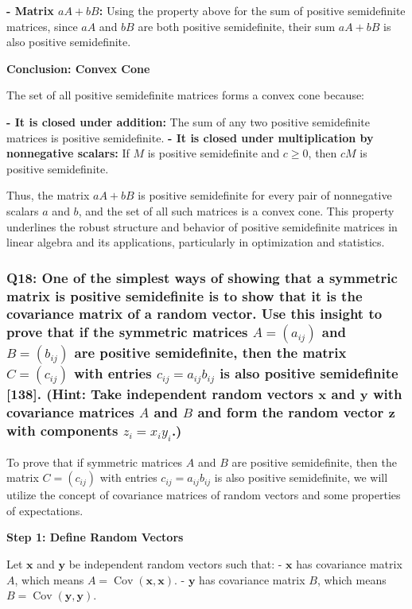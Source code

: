 \documentclass[8pt]{article}
\begin{document}
{{\textbf{- Matrix \(aA + bB\): }Using the property above for the sum of positive semidefinite matrices, since \(aA\) and \(bB\) are both positive semidefinite, their sum \(aA + bB\) is also positive semidefinite.

\textbf{Conclusion: Convex Cone}

The set of all positive semidefinite matrices forms a convex cone because:

\textbf{- It is closed under addition:} The sum of any two positive semidefinite matrices is positive semidefinite.
\textbf{- It is closed under multiplication by nonnegative scalars: }If \(M\) is positive semidefinite and \(c \geq 0\), then \(cM\) is positive semidefinite.

Thus, the matrix \(aA + bB\) is positive semidefinite for every pair of nonnegative scalars \(a\) and \(b\), and the set of all such matrices is a convex cone. This property underlines the robust structure and behavior of positive semidefinite matrices in linear algebra and its applications, particularly in optimization and statistics.

\subsubsection*{Q18: One of the simplest ways of showing that a symmetric matrix is positive semidefinite is to show that it is the covariance matrix of a random vector. Use this insight to prove that if the symmetric matrices \(A = (a_{ij})\) and \(B = (b_{ij})\) are positive semidefinite, then the matrix \(C = (c_{ij})\) with entries \(c_{ij} = a_{ij} b_{ij}\) is also positive semidefinite [138]. (Hint: Take independent random vectors \(\mathbf{x}\) and \(\mathbf{y}\) with covariance matrices \(A\) and \(B\) and form the random vector \(\mathbf{z}\) with components \(z_i = x_i y_i\).)}

To prove that if symmetric matrices \(A\) and \(B\) are positive semidefinite, then the matrix \(C = (c_{ij})\) with entries \(c_{ij} = a_{ij} b_{ij}\) is also positive semidefinite, we will utilize the concept of covariance matrices of random vectors and some properties of expectations.

\textbf{Step 1: Define Random Vectors}

Let \(\mathbf{x}\) and \(\mathbf{y}\) be independent random vectors such that:
- \(\mathbf{x}\) has covariance matrix \(A\), which means \(A = \operatorname{Cov}(\mathbf{x}, \mathbf{x})\).
- \(\mathbf{y}\) has covariance matrix \(B\), which means \(B = \operatorname{Cov}(\mathbf{y}, \mathbf{y})\).

}}
\end{document}
